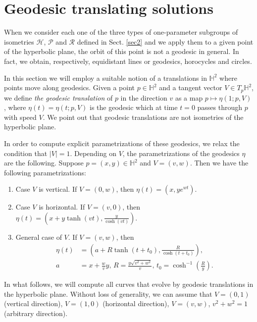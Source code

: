 \documentclass[12pt]{amsart}
\theoremstyle{plain}
\theoremstyle{definition}
\def\h{\mathbb H}
\begin{document}
\section{Geodesic translating solutions}
\label{sec3}

When we consider each one of the three types of one-parameter subgroups of isometries $\mathcal{H}$, $\mathcal{P}$ and $\mathcal{R}$ defined in Sect. \ref{sec2} and we apply them to a given point of the hyperbolic plane, the orbit of this point is not a geodesic in general. In fact, we obtain, respectively, equidistant lines or geodesics,  horocycles and circles.
 
In this section we will employ a   suitable notion of a translations in $\h^2$ where points move along geodesics. Given a point $p \in \h^2$ and a tangent vector $V \in T_p \h^2$,  we define \textit{the geodesic translation} of  $p$ in the direction $v$ as a map $p \mapsto \eta(1;p,V)$,  where $\eta(t)=\eta(t;p,V)$ is the geodesic which at time $t = 0$ passes through $p$ with speed $V$. We point out that   geodesic translations are not isometries of the hyperbolic plane.


In order to compute   explicit parametrizations of these geodesics, we   relax the condition that $|V|=1$.  Depending on $V$, the parametrizations of the geodesics $\eta$ are the following. Suppose $p= (x,y) \in \h^2$ and $V=(v,w)$. Then we have  the following parametrizations:
\begin{enumerate}
\item Case $V$ is vertical. If $V=(0,w)$, then  $\eta(t) = (x, y e^{ w t})$. 
\item Case $V$ is horizontal. If $V=(v,0)$, then $
  \eta(t) = (x + y \tanh(vt), \frac{y}{\cosh(vt)})$. 
  \item General case of $V$. If $V=(v,w)$, then
 \begin{equation*}
 \begin{split}
 \eta(t) &= (a + R\tanh(t+t_0), \frac{R}{\cosh(t+t_0)}),\\
a& = x + \frac{w}{v}y,\,  R = \frac{y \sqrt{v^2+w^2}}{v},\, t_0 = \cosh^{-1} \left( \frac{R}{y}\right).
\end{split}
\end{equation*}
 \end{enumerate}
In what follows, we will compute all curves that evolve by geodesic translations in the hyperbolic plane. Without loss of generality, we can assume that $V=(0,1)$ (vertical direction), $V=(1,0)$ (horizontal direction), $V=(v,w)$, $v^2+w^2=1$ (arbitrary direction). 
\end{document}
